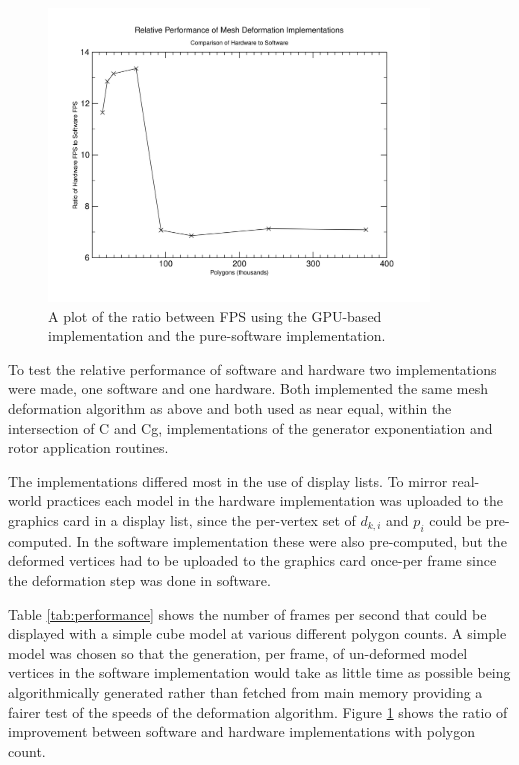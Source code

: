 \begin{figure}[p]
\centering
\includegraphics[width=0.9\textwidth]{performance}
\caption{\label{fig:performance}A plot of the ratio between FPS using the
GPU-based implementation and the pure-software implementation.}
\end{figure}

To test the relative performance of software and hardware two implementations
were made, one software and one hardware. Both implemented the same mesh deformation
algorithm as above and both used as near equal, within the intersection of C and
Cg, implementations of the generator exponentiation and rotor application
routines.

The implementations differed most in the use of display lists. To mirror real-world
practices each model in the hardware implementation was uploaded to the graphics
card in a display list, since the per-vertex set of $d_{k,i}$ and $p_i$ could
be pre-computed. In the software implementation these were also pre-computed, but the
deformed vertices had to be uploaded to the graphics card once-per frame since the
deformation step was done in software.

Table \ref{tab:performance} shows the number of frames per second that could be
displayed with a simple cube model at various different polygon counts. A simple model
was chosen so that the generation, per frame, of un-deformed model vertices in the
software implementation would take as little time as possible being 
algorithmically generated rather than fetched from main memory providing a fairer
test of the speeds of the deformation algorithm. Figure \ref{fig:performance} shows
the ratio of improvement between software and hardware implementations with polygon
count.

